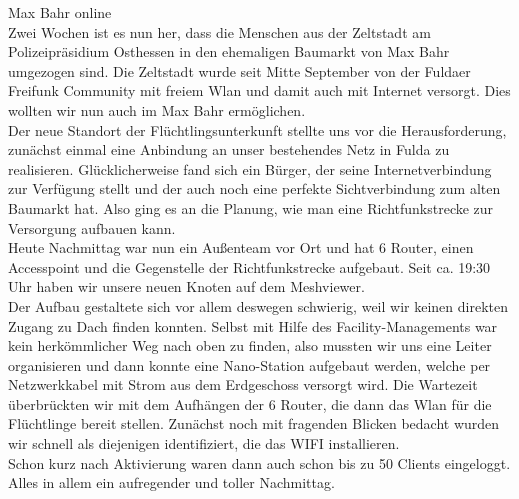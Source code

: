 {\huge Max Bahr online}\\



Zwei Wochen ist es nun her, dass die Menschen aus der Zeltstadt am Polizeipräsidium Osthessen in den ehemaligen Baumarkt von Max Bahr umgezogen sind. Die Zeltstadt wurde seit Mitte September von der Fuldaer Freifunk Community mit freiem Wlan und damit auch mit Internet versorgt. Dies wollten wir nun auch im Max Bahr ermöglichen.\\

Der neue Standort der Flüchtlingsunterkunft stellte uns vor die Herausforderung, zunächst einmal eine Anbindung an unser bestehendes Netz in Fulda zu realisieren. Glücklicherweise fand sich ein Bürger, der seine Internetverbindung zur Verfügung stellt und der auch noch eine perfekte Sichtverbindung zum alten Baumarkt hat. Also ging es an die Planung, wie man eine Richtfunkstrecke zur Versorgung aufbauen kann.\\

Heute Nachmittag war nun ein Außenteam vor Ort und hat 6 Router, einen Accesspoint und die Gegenstelle der Richtfunkstrecke aufgebaut. Seit ca. 19:30 Uhr haben wir unsere neuen Knoten auf dem Meshviewer.\\

Der Aufbau gestaltete sich vor allem deswegen schwierig, weil wir keinen direkten Zugang zu Dach finden konnten. Selbst mit Hilfe des Facility-Managements war kein herkömmlicher Weg nach oben zu finden, also mussten wir uns eine Leiter organisieren und dann konnte eine Nano-Station aufgebaut werden, welche per Netzwerkkabel mit Strom aus dem Erdgeschoss versorgt wird. Die Wartezeit überbrückten wir mit dem Aufhängen der 6 Router, die dann das Wlan für die Flüchtlinge bereit stellen. Zunächst noch mit fragenden Blicken bedacht wurden wir schnell als diejenigen identifiziert, die das WIFI installieren. \\

Schon kurz nach Aktivierung waren dann auch schon bis zu 50 Clients eingeloggt. Alles in allem ein aufregender und toller Nachmittag. \\

